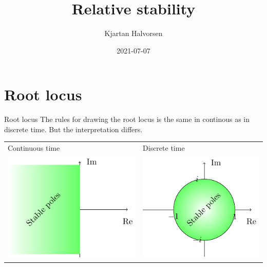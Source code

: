 \documentclass[presentation,aspectratio=169]{beamer}
\author{Kjartan Halvorsen}
\date{2021-07-07}
\title{Relative stability}
\begin{document}
\maketitle

\section{Root locus}
\label{sec:org1ad48f0}
\begin{frame}[label={sec:org715e3d0}]{Root locus}
The rules for drawing the root locus is the same in continous as in discrete time. But the interpretation differs.
\begin{center}
\begin{tabular}{ll}
Continuous time & Discrete time\\
\includegraphics[width=0.28\linewidth]{../../figures/cont-stable} & \includegraphics[width=0.28\linewidth]{../../figures/discrete-stable}\\
\end{tabular}
\end{center}
\end{frame}
\end{document}

